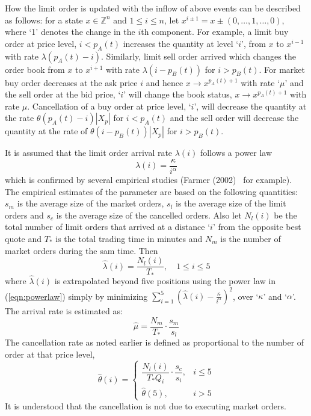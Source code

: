 How the limit order is updated with the inflow of above events can be described as follows: for a state $x \in \mathbb{Z}^n$ and $1 \leq i \leq n$, let $x^{i \pm 1}=x \pm (0,\ldots,1,\ldots,0)$, where `1' denotes the change in the $i$th component. For example, a limit buy order at price level, $i<p_A(t)$ increases the quantity at level `$i$', from $x$ to $x^{i-1}$ with rate $\lambda(p_A(t)-i)$. Similarly, limit sell order arrived which changes the order book from $x$ to $x^{i+1}$ with rate $\lambda(i-p_B(t))$ for $i>p_B(t)$. For market buy order decreases at the ask price $i$ and hence $x \to x^{p_A(t)+1}$ with rate `$\mu$' and the sell order at the bid price, `$i$' will change the book status, $x \to x^{p_A(t)+1}$ with rate $\mu$. Cancellation of a buy order at price level, `$i$', will decrease the quantity at the rate $\theta(p_A(t)-i)|X_p|$ for $i<p_A(t)$ and the sell order will decrease the quantity at the rate of $\theta(i-p_B(t))|X_p|$ for $i>p_B(t)$.


It is assumed that the limit order arrival rate $\lambda(i)$ follows a power law
	\begin{equation}\label{eqn:powerlaw}
	\lambda(i)=\dfrac{\kappa}{i^\alpha}
	\end{equation}
which is confirmed by several empirical studies (Farmer (2002)~\cite{} for example). The empirical estimates of the parameter are based on the following quantities: $s_m$ is the average size of the market orders, $s_l$ is the average size of the limit orders and $s_c$ is the average size of the cancelled orders. Also let $N_l(i)$ be the total number of limit orders that arrived at a distance `$i$' from the opposite best quote and $T_*$ is the total trading time in minutes and $N_m$ is the number of market orders during the sam time. Then 
	\begin{equation}\label{eqn:hatlambdant}
	\hat{\lambda}(i)= \dfrac{N_l(i)}{T_*}, \quad 1 \leq i \leq 5
	\end{equation}
where $\hat{\lambda}(i)$ is extrapolated beyond five positions using the power law in (\ref{eqn:powerlaw}) simply by minimizing $\sum_{i=1}^5 (\hat{\lambda}(i)- \frac{\kappa}{i^\alpha})^2$, over `$\kappa$' and `$\alpha$'. The arrival rate is estimated as:
	\begin{equation}\label{eqn:hatnmt}
	\hat{\mu}=\dfrac{N_m}{T_*} \cdot \dfrac{s_m}{s_l}
	\end{equation}
The cancellation rate as noted earlier is defined as proportional to the number of order at that price level,
	\begin{equation}\label{eqn:hatthetacase}
	\hat{\theta}(i)=
	\begin{cases}
	\dfrac{N_l(i)}{T_*Q_i} \cdot \dfrac{s_c}{s_i}, & i \leq 5 \\
	\hat{\theta}(5), & i>5
	\end{cases}
	\end{equation}
It is understood that the cancellation is not due to executing market orders.


